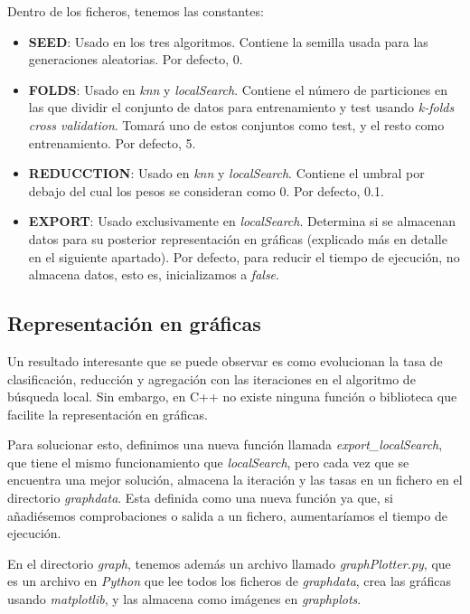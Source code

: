 \documentclass[11pt,a4paper]{article}
\begin{document}
Dentro de los ficheros, tenemos las constantes:
\begin{itemize}
\item \textbf{SEED}: Usado en los tres algoritmos. Contiene la semilla usada para las generaciones aleatorias. Por defecto, 0.
\item \textbf{FOLDS}: Usado en \emph{knn} y \emph{localSearch}. Contiene el número de particiones en las que dividir el conjunto de datos para entrenamiento y test usando \emph{k-folds cross validation}.
Tomará uno de estos conjuntos como test, y el resto como entrenamiento. Por defecto, 5.
\item \textbf{REDUCCTION}: Usado en \emph{knn} y \emph{localSearch}. Contiene el umbral por debajo del cual los pesos se consideran como 0. Por defecto, 0.1.
\item \textbf{EXPORT}: Usado exclusivamente en \emph{localSearch}. Determina si se almacenan datos para su posterior representación en gráficas (explicado más en detalle en el siguiente apartado). Por defecto, para reducir el tiempo de ejecución, no almacena datos, esto es, inicializamos a \emph{false}.
\end{itemize}

\subsection{Representación en gráficas} \label{sec:graphs}

Un resultado interesante que se puede observar es como evolucionan la tasa de clasificación, reducción y agregación con las iteraciones en el algoritmo de búsqueda local. Sin embargo, en C++ no existe ninguna función o biblioteca que facilite la representación en gráficas.

Para solucionar esto, definimos una nueva función llamada \emph{export\_localSearch}, que tiene el mismo funcionamiento que \emph{localSearch}, pero cada vez que se encuentra una mejor solución, almacena la iteración y las tasas en un fichero en el directorio \emph{graph\/data}. Esta definida como una nueva función ya que, si añadiésemos comprobaciones o salida a un fichero, aumentaríamos el tiempo de ejecución.

En el directorio \emph{graph}, tenemos además un archivo llamado \emph{graphPlotter.py}, que es un archivo en \emph{Python} que lee todos los ficheros de \emph{graph\/data}, crea las gráficas usando \emph{matplotlib}, y las almacena como imágenes en \emph{graph\/plots}.
\end{document}
